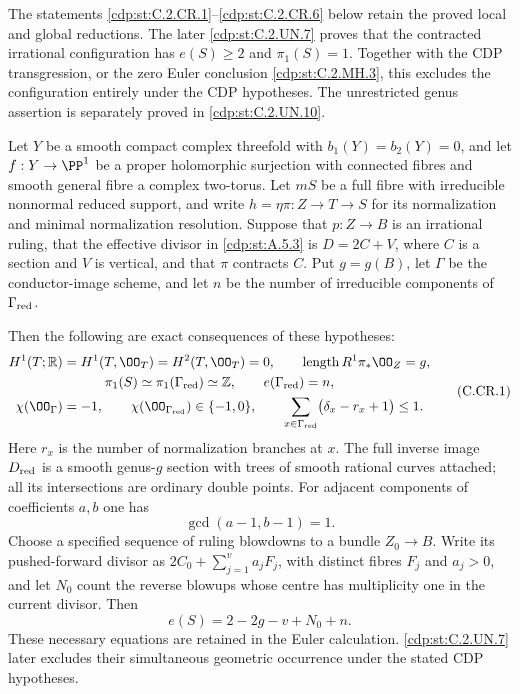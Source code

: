 
The statements \ref{cdp:st:C.2.CR.1}--\ref{cdp:st:C.2.CR.6} below retain the
proved local and global reductions. The later
\ref{cdp:st:C.2.UN.7} proves that the contracted irrational
configuration has $e(S)\ge2$ and $\pi_1(S)=1$.
Together with the CDP transgression, or the zero
Euler conclusion \ref{cdp:st:C.2.MH.3}, this excludes the
configuration entirely under the CDP hypotheses.
The unrestricted genus assertion is separately
proved in \ref{cdp:st:C.2.UN.10}.

\begin{proposition}\label{cdp:st:C.2.CR.1}
Let $Y$ be a smooth compact complex threefold with
$b_1(Y)=b_2(Y)=0$, and let $f:Y\to\PP^1$ be a proper
holomorphic surjection with connected fibres and smooth
general fibre a complex two-torus. Let $mS$
be a full fibre with irreducible nonnormal reduced support, and
write $h=\eta\pi:Z\to T\to S$ for its normalization and minimal
normalization resolution. Suppose that $p:Z\to B$ is an
irrational ruling, that the effective divisor in \ref{cdp:st:A.5.3} is
$D=2C+V$, where $C$ is a section and $V$ is vertical, and
that $\pi$ contracts $C$. Put $g=g(B)$, let $\Gamma$ be the
conductor-image scheme, and let $n$ be the number of irreducible
components of $\Gamma_{\rm red}$.

Then the following are exact consequences of these hypotheses:
\[
\begin{gathered}
 H^1(T;\mathbb R)=H^1(T,\OO_T)=H^2(T,\OO_T)=0,
 \qquad \operatorname{length}R^1\pi_*\OO_Z=g,\\
 \pi_1(S)\simeq\pi_1(\Gamma_{\rm red})\simeq\mathbb Z,
 \qquad e(\Gamma_{\rm red})=n,\\
 \chi(\OO_\Gamma)=-1,\qquad
 \chi(\OO_{\Gamma_{\rm red}})\in\{-1,0\},\qquad
 \sum_{x\in\Gamma_{\rm red}}\bigl(\delta_x-r_x+1\bigr)\le1.
\end{gathered}
\tag{C.CR.1}\label{cdp:eq:C.CR.1}
\]
Here $r_x$ is the number of normalization branches at $x$.
The full inverse image $D_{\rm red}$ is a smooth genus-$g$
section with trees of smooth rational curves attached; all
its intersections are ordinary double points. For adjacent
components of coefficients $a,b$ one has
\[
                         \gcd(a-1,b-1)=1.          \tag{C.CR.2}\label{cdp:eq:C.CR.2}
\]
Choose a specified sequence of ruling blowdowns to a bundle
$Z_0\to B$. Write its pushed-forward divisor as
$2C_0+\sum_{j=1}^{v}a_jF_j$, with distinct fibres $F_j$
and $a_j>0$, and let $N_0$ count the reverse blowups whose
centre has multiplicity one in the current divisor. Then
\[
                     e(S)=2-2g-v+N_0+n.           \tag{C.CR.3}\label{cdp:eq:C.CR.3}
\]
These necessary equations are retained in the Euler
calculation. \ref{cdp:st:C.2.UN.7} later excludes their simultaneous
geometric occurrence under the stated CDP hypotheses.
\end{proposition}
